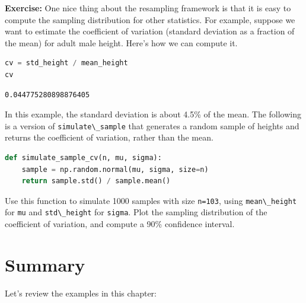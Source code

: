 \textbf{Exercise:} One nice thing about the resampling framework is that
it is easy to compute the sampling distribution for other statistics.
For example, suppose we want to estimate the coefficient of variation
(standard deviation as a fraction of the mean) for adult male height.
Here's how we can compute it.

\begin{lstlisting}[language=Python,style=source]
cv = std_height / mean_height
cv
\end{lstlisting}

\begin{lstlisting}[style=output]
0.044775280898876405
\end{lstlisting}

In this example, the standard deviation is about 4.5\% of the mean. The
following is a version of \passthrough{\lstinline!simulate\_sample!}
that generates a random sample of heights and returns the coefficient of
variation, rather than the mean.

\begin{lstlisting}[language=Python,style=source]
def simulate_sample_cv(n, mu, sigma):
    sample = np.random.normal(mu, sigma, size=n)
    return sample.std() / sample.mean()
\end{lstlisting}

Use this function to simulate 1000 samples with size
\passthrough{\lstinline!n=103!}, using
\passthrough{\lstinline!mean\_height!} for \passthrough{\lstinline!mu!}
and \passthrough{\lstinline!std\_height!} for
\passthrough{\lstinline!sigma!}. Plot the sampling distribution of the
coefficient of variation, and compute a 90\% confidence interval.

\hypertarget{summary}{%
\section{Summary}\label{summary}}

Let's review the examples in this chapter:

